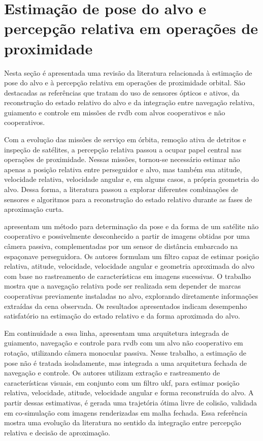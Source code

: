 \section{Estimação de pose do alvo e percepção relativa em operações de proximidade}
\label{sec_estimacao_pose_alvo_percepcao_relativa}

Nesta seção é apresentada uma revisão da literatura relacionada à estimação de pose do alvo e à percepção relativa em operações de proximidade orbital. São destacadas as referências que tratam do uso de sensores ópticos e ativos, da reconstrução do estado relativo do alvo e da integração entre navegação relativa, guiamento e controle em missões de \gls{rvdb} com alvos cooperativos e não cooperativos.

Com a evolução das missões de serviço em órbita, remoção ativa de detritos e inspeção de satélites, a percepção relativa passou a ocupar papel central nas operações de proximidade. Nessas missões, tornou-se necessário estimar não apenas a posição relativa entre perseguidor e alvo, mas também sua atitude, velocidade relativa, velocidade angular e, em alguns casos, a própria geometria do alvo. Dessa forma, a literatura passou a explorar diferentes combinações de sensores e algoritmos para a reconstrução do estado relativo durante as fases de aproximação curta.

\cite{volpe2018passive} apresentam um método para determinação da pose e da forma de um satélite não cooperativo e possivelmente desconhecido a partir de imagens obtidas por uma câmera passiva, complementadas por um sensor de distância embarcado na espaçonave perseguidora. Os autores formulam um filtro capaz de estimar posição relativa, atitude, velocidade, velocidade angular e geometria aproximada do alvo com base no rastreamento de características em imagens sucessivas. O trabalho mostra que a navegação relativa pode ser realizada sem depender de marcas cooperativas previamente instaladas no alvo, explorando diretamente informações extraídas da cena observada. Os resultados apresentados indicam desempenho satisfatório na estimação do estado relativo e da forma aproximada do alvo.

Em continuidade a essa linha, \cite{volpe2022gnc} apresentam uma arquitetura integrada de guiamento, navegação e controle para \gls{rvdb} com um alvo não cooperativo em rotação, utilizando câmera monocular passiva. Nesse trabalho, a estimação de pose não é tratada isoladamente, mas integrada a uma arquitetura fechada de navegação e controle. Os autores utilizam extração e rastreamento de características visuais, em conjunto com um filtro \gls{ukf}, para estimar posição relativa, velocidade, atitude, velocidade angular e forma reconstruída do alvo. A partir dessas estimativas, é gerada uma trajetória ótima livre de colisão, validada em co-simulação com imagens renderizadas em malha fechada. Essa referência mostra uma evolução da literatura no sentido da integração entre percepção relativa e decisão de aproximação.

